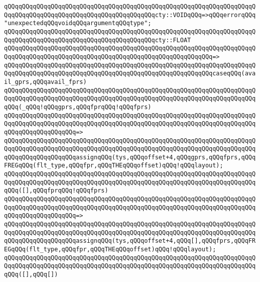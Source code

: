 \verb|qQQqqQQqqQQqqQQqqQQqqQQqqQQqqQQqqQQqqQQqqQQqqQQqqQQqqQQqqQQqqQQqqQQqqQQqqQQqqQQqqQQqqQQqqQQqqQQqqQQqqQQqqQQqqQQqcty::VOIDqQQq=>qQQqerrorqQQq"unexpectedqQQqvoidqQQqargumentqQQqtype";|\newline
\newline
\verb|qQQqqQQqqQQqqQQqqQQqqQQqqQQqqQQqqQQqqQQqqQQqqQQqqQQqqQQqqQQqqQQqqQQqqQQqqQQqqQQqqQQqqQQqqQQqqQQqqQQqqQQqqQQqqQQqcty::FLOAT|\newline
\verb|qQQqqQQqqQQqqQQqqQQqqQQqqQQqqQQqqQQqqQQqqQQqqQQqqQQqqQQqqQQqqQQqqQQqqQQqqQQqqQQqqQQqqQQqqQQqqQQqqQQqqQQqqQQqqQQqqQQqqQQqqQQqqQQq=>|\newline
\verb|qQQqqQQqqQQqqQQqqQQqqQQqqQQqqQQqqQQqqQQqqQQqqQQqqQQqqQQqqQQqqQQqqQQqqQQqqQQqqQQqqQQqqQQqqQQqqQQqqQQqqQQqqQQqqQQqqQQqqQQqqQQqqQQqcaseqQQq(avail_gprs,qQQqavail_fprs)|\newline
\newline
\verb|qQQqqQQqqQQqqQQqqQQqqQQqqQQqqQQqqQQqqQQqqQQqqQQqqQQqqQQqqQQqqQQqqQQqqQQqqQQqqQQqqQQqqQQqqQQqqQQqqQQqqQQqqQQqqQQqqQQqqQQqqQQqqQQqqQQqqQQqqQQqqQQq(_qQQq!qQQqgprs,qQQqfprqQQq!qQQqfprs)|\newline
\verb|qQQqqQQqqQQqqQQqqQQqqQQqqQQqqQQqqQQqqQQqqQQqqQQqqQQqqQQqqQQqqQQqqQQqqQQqqQQqqQQqqQQqqQQqqQQqqQQqqQQqqQQqqQQqqQQqqQQqqQQqqQQqqQQqqQQqqQQqqQQqqQQqqQQqqQQqqQQqqQQq=>|\newline
\verb|qQQqqQQqqQQqqQQqqQQqqQQqqQQqqQQqqQQqqQQqqQQqqQQqqQQqqQQqqQQqqQQqqQQqqQQqqQQqqQQqqQQqqQQqqQQqqQQqqQQqqQQqqQQqqQQqqQQqqQQqqQQqqQQqqQQqqQQqqQQqqQQqqQQqqQQqqQQqqQQqassignqQQq(tys,qQQqoffset+4,qQQqgprs,qQQqfprs,qQQqFREGqQQq(flt_type,qQQqfpr,qQQqTHEqQQqoffset)qQQq!qQQqlayout);|\newline
\newline
\verb|qQQqqQQqqQQqqQQqqQQqqQQqqQQqqQQqqQQqqQQqqQQqqQQqqQQqqQQqqQQqqQQqqQQqqQQqqQQqqQQqqQQqqQQqqQQqqQQqqQQqqQQqqQQqqQQqqQQqqQQqqQQqqQQqqQQqqQQqqQQqqQQq([],qQQqfprqQQq!qQQqfprs)|\newline
\verb|qQQqqQQqqQQqqQQqqQQqqQQqqQQqqQQqqQQqqQQqqQQqqQQqqQQqqQQqqQQqqQQqqQQqqQQqqQQqqQQqqQQqqQQqqQQqqQQqqQQqqQQqqQQqqQQqqQQqqQQqqQQqqQQqqQQqqQQqqQQqqQQqqQQqqQQqqQQqqQQq=>|\newline
\verb|qQQqqQQqqQQqqQQqqQQqqQQqqQQqqQQqqQQqqQQqqQQqqQQqqQQqqQQqqQQqqQQqqQQqqQQqqQQqqQQqqQQqqQQqqQQqqQQqqQQqqQQqqQQqqQQqqQQqqQQqqQQqqQQqqQQqqQQqqQQqqQQqqQQqqQQqqQQqqQQqassignqQQq(tys,qQQqoffset+4,qQQq[],qQQqfprs,qQQqFREGqQQq(flt_type,qQQqfpr,qQQqTHEqQQqoffset)qQQq!qQQqlayout);|\newline
\newline
\verb|qQQqqQQqqQQqqQQqqQQqqQQqqQQqqQQqqQQqqQQqqQQqqQQqqQQqqQQqqQQqqQQqqQQqqQQqqQQqqQQqqQQqqQQqqQQqqQQqqQQqqQQqqQQqqQQqqQQqqQQqqQQqqQQqqQQqqQQqqQQqqQQq([],qQQq[])|\newline
